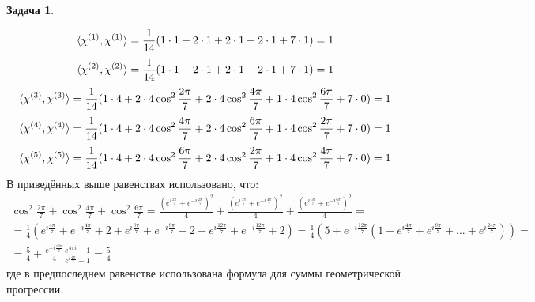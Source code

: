 \documentclass[12pt]{article}
\theoremstyle{definition}
\newtheorem{zad}{Задача}[section]
\begin{document}
\begin{zad}
\begin{itemize}
\begin{equation}
    \braket{\chi^{(1)},\chi^{(1)}}=\frac{1}{14}(1\cdot1+2\cdot1+2\cdot 1+2\cdot 1+7\cdot1)=1
\end{equation}
\begin{equation}
    \braket{\chi^{(2)},\chi^{(2)}}=\frac{1}{14}(1\cdot1+2\cdot1+2\cdot 1+2\cdot 1+7\cdot1)=1
\end{equation}
\begin{equation}
    \braket{\chi^{(3)},\chi^{(3)}}=\frac{1}{14}(1\cdot4+2\cdot4\cos^2\frac{2\pi}{7}+2\cdot4\cos^2\frac{4\pi}{7}+1\cdot4\cos^2\frac{6\pi}{7}+7\cdot0)=1
\end{equation}
\begin{equation}
    \braket{\chi^{(4)},\chi^{(4)}}=\frac{1}{14}(1\cdot4+2\cdot4\cos^2\frac{4\pi}{7}+2\cdot4\cos^2\frac{6\pi}{7}+1\cdot4\cos^2\frac{2\pi}{7}+7\cdot0)=1
\end{equation}
\begin{equation}
    \braket{\chi^{(5)},\chi^{(5)}}=\frac{1}{14}(1\cdot4+2\cdot4\cos^2\frac{6\pi}{7}+2\cdot4\cos^2\frac{2\pi}{7}+1\cdot4\cos^2\frac{4\pi}{7}+7\cdot0)=1
\end{equation}
В приведённых выше равенствах использовано, что:
\begin{multline}
    \cos^2\frac{2\pi}{7}+\cos^2\frac{4\pi}{7}+\cos^2\frac{6\pi}{7}=\frac{(e^{i\frac{2\pi}{7}}+e^{-i\frac{2\pi}{7}})^2}{4}+\frac{(e^{i\frac{4\pi}{7}}+e^{-i\frac{4\pi}{7}})^2}{4}+\frac{(e^{i\frac{6\pi}{7}}+e^{-i\frac{6\pi}{7}})^2}{4}=\\=\frac{1}{4}(e^{i\frac{4\pi}{7}}+e^{-i\frac{4\pi}{7}}+2+e^{i\frac{8\pi}{7}}+e^{-i\frac{8\pi}{7}}+2+e^{i\frac{12\pi}{7}}+e^{-i\frac{12\pi}{7}}+2)=\frac{1}{4}(5+e^{-i\frac{12\pi}{7}}(1+e^{i\frac{4\pi}{7}}+e^{i\frac{8\pi}{7}}+...+e^{i\frac{24\pi}{7}}))=\\=\frac{5}{4}+\frac{e^{-i\frac{12\pi}{7}}}{4}\frac{e^{4\pi i}-1}{e^{i\frac{4\pi}{7}}-1}=\frac{5}{4}
\end{multline}
где в предпоследнем равенстве использована формула для суммы геометрической прогрессии.
\end{itemize}
\end{zad}
\end{document}
